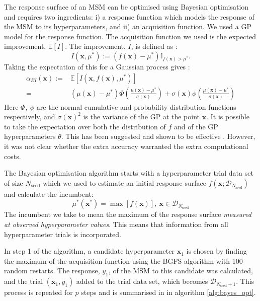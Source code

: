 \documentclass{article}
\begin{document}
The response surface of an MSM can be optimised using Bayesian optimisation and requires two ingredients: i) a response function which models the response of the MSM to its hyperparameters, and ii) an acquisition function. We used a GP model for the response function. The acquisition function we used is the expected improvement, $\mathbb{E}\left[I\right]$. The improvement, $I$, is defined as \cite{shahriariTakingHumanOut2016}:
\begin{equation}
    I(\mathbf{x}, \mu^{*}):=(f(\mathbf{x}) - \mu^{*}) \mathbb{I}_{f(\mathbf{x}) > \mu^{*}}.
\end{equation}
Taking the expectation of this for a Gaussian process gives \cite{shahriariTakingHumanOut2016}:
\begin{align}\label{eqn:msm_ei_def}
        \alpha_{EI}(\mathbf{x}) := &  \mathbb{E}\left[I(\mathbf{x}, f(\mathbf{x}), \mu^{*})\right] \\
         =  &(\mu(\mathbf{x}) - \mu^{*})\Phi\left( \frac{ \mu(\mathbf{x}) - \mu^{*} }{\sigma(\mathbf{x})} \right ) + \sigma(\mathbf{x})\phi\left( \frac{ \mu(\mathbf{x}) - \mu^{*} }{\sigma(\mathbf{x}) } \right )
\end{align}
Here $\Phi,\ \phi$ are the normal cumulative and probability distribution functions respectively, and $\sigma(\mathbf{x})^{2}$ is the variance of the GP at the point $\mathbf{x}$. It is possible to take the expectation over both the distribution of $f$ and of the GP hyperparameters $\theta$. This has been suggested and shown to be effective \cite{NIPS2012_4522}. However, it was not clear whether the extra accuracy warranted the extra computational costs. 

The Bayesian optimisation algorithm \cite{shahriariTakingHumanOut2016} starts with a hyperparameter trial data set of size $N_{\mathrm{seed}}$ which we used to estimate an initial response surface $f(\mathbf{x}; \mathcal{D}_{N_{\mathrm{seed}}})$ and calculate the incumbent: 
\begin{equation}
    \mu^{*}(\mathbf{x}^{*}) = \max{\left[f(\mathbf{x})\right]},\ \mathbf{x}\in \mathcal{D}_{N_{\mathrm{seed}}}
\end{equation}
The incumbent we take to mean the maximum of the response surface \emph{measured at observed hyperparameter values}. This means that information from all hyperparameter trials is incorporated. 

In step 1 of the algorithm, a candidate hyperparameter $\mathbf{x}_{1}$ is chosen by finding the maximum of the acquisition function using the BGFS algorithm with 100 random restarts.  The response, $y_{1}$, of the MSM to this candidate was calculated, and the trial $(\mathbf{x}_{1}, y_{1})$ added to the trial data set, which becomes  $\mathcal{D}_{N_{\mathrm{seed}}+1}$. This process is repeated for $p$ steps and is summarised in in algorithm \ref{alg:bayes_opt}.
\end{document}
